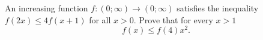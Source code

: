 \problem
An increasing function $f \colon (0; \infty) \to (0; \infty)$ satisfies the
inequality $f (2 x) \leq 4 f (x + 1)$ for all $x > 0$.
Prove that for every $x > 1$
\[
    f(x) \leq f(4) x^2
.\]

\solution

\endproblem

